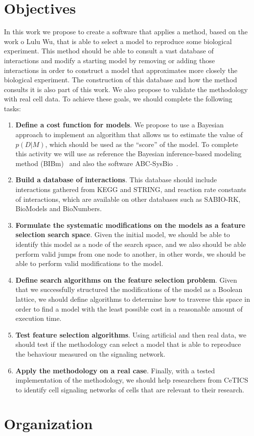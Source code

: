 \section{Objectives}
In this work we propose to create a software that applies a method, 
based on the work o Lulu Wu, that is able to select a model to
reproduce some biological experiment. This method should be able to 
consult a vast database of interactions and modify a starting model by
removing or adding those interactions in order to construct a model that
approximates more closely the biological experiment. The construction of
this database and how the method consults it is also part of this work. 
We also propose to validate the methodology with real cell data. To 
achieve these goals, we should complete the following tasks:
\begin{enumerate}
    \item{{\bf Define a cost function for models}. We propose to use a 
        Bayesian approach to implement an algorithm that allows us to 
        estimate the value of $p (D|M)$, which should be used as the 
        ``score'' of the model. To complete this activity we will use as 
        reference the Bayesian inference-based modeling method 
        (BIBm)~\cite{Xura20} and also the software 
        ABC-SysBio~\cite{Liepe2014}.}
    \item{{\bf Build a database of interactions}. This database should 
        include interactions gathered from KEGG and STRING, and 
        reaction rate constants of interactions, which are available on 
        other databases such as SABIO-RK, BioModels and BioNumbers.}
    \item{{\bf Formulate the systematic modifications on the models as a 
        feature selection search space}. Given the initial model, we 
        should be able to identify this model as a node of the search 
        space, and we also should be able perform valid jumps from one 
        node to another, in other words, we should be able to perform 
        valid modifications to the model.}
    \item{{\bf Define search algorithms on the feature selection 
        problem}. Given that we successfully structured the 
        modifications of the model as a Boolean lattice, we should 
        define algorithms to determine how to traverse this space in 
        order to find a model with the least possible cost in a 
        reasonable amount of execution time.}
    \item{{\bf Test feature selection algorithms}. Using artificial and
        then real data, we should test if the methodology can select a 
        model that is able to reproduce the behaviour measured
        on the signaling network.}
    \item{{\bf Apply the methodology on a real case}. Finally, with a
        tested implementation of the methodology, we should help 
        researchers from CeTICS to identify cell signaling networks of
        cells that are relevant to their research.}
\end{enumerate}
\section{Organization}
